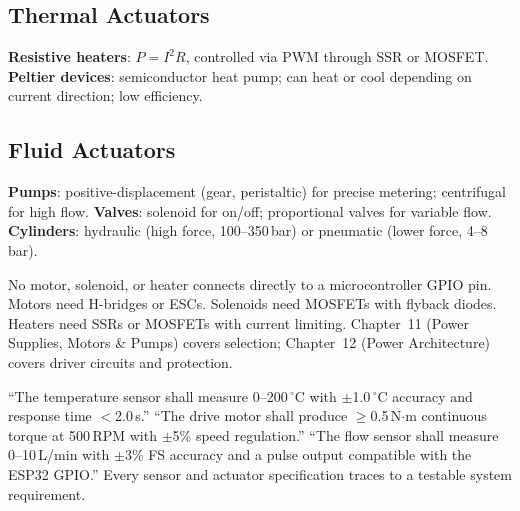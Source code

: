 \documentclass[11pt,letterpaper,twoside,openany]{book}
\newcommand{\degC}{\ensuremath{{}^{\circ}\text{C}}}
\begin{document}
\subsection{Thermal Actuators}
\textbf{Resistive heaters}: $P = I^2R$, controlled via PWM through SSR or MOSFET. \textbf{Peltier devices}: semiconductor heat pump; can heat or cool depending on current direction; low efficiency.

\subsection{Fluid Actuators}
\textbf{Pumps}: positive-displacement (gear, peristaltic) for precise metering; centrifugal for high flow. \textbf{Valves}: solenoid for on/off; proportional valves for variable flow. \textbf{Cylinders}: hydraulic (high force, 100--350\,bar) or pneumatic (lower force, 4--8\,bar).

\begin{warningbox}
No motor, solenoid, or heater connects directly to a microcontroller GPIO pin. Motors need H-bridges or ESCs. Solenoids need MOSFETs with flyback diodes. Heaters need SSRs or MOSFETs with current limiting. Chapter~11 (Power Supplies, Motors \& Pumps) covers selection; Chapter~12 (Power Architecture) covers driver circuits and protection.
\end{warningbox}

\begin{keyconceptbox}
``The temperature sensor shall measure 0--200\,\degC{} with $\pm$1.0\,\degC{} accuracy and response time $<$2.0\,s.'' ``The drive motor shall produce $\geq$0.5\,N$\cdot$m continuous torque at 500\,RPM with $\pm$5\% speed regulation.'' ``The flow sensor shall measure 0--10\,L/min with $\pm$3\% FS accuracy and a pulse output compatible with the ESP32 GPIO.'' Every sensor and actuator specification traces to a testable system requirement.
\end{keyconceptbox}
\end{document}
